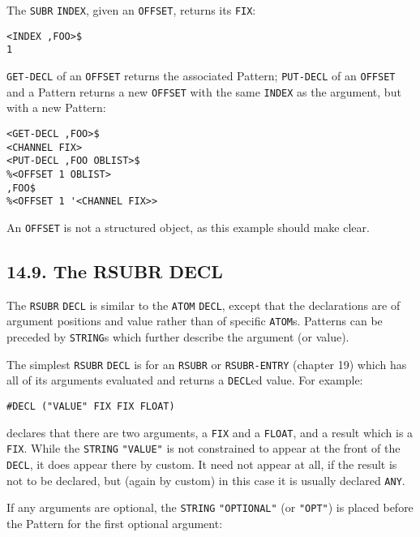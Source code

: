 \documentclass[a4paper,]{article}
\begin{document}
The \texttt{SUBR} \texttt{INDEX}, given an \texttt{OFFSET}, returns its \texttt{FIX}:

\begin{verbatim}
<INDEX ,FOO>$
1
\end{verbatim}

\texttt{GET-DECL} of an \texttt{OFFSET} returns the associated Pattern; \texttt{PUT-DECL}
 of an \texttt{OFFSET} and a Pattern returns a new \texttt{OFFSET} with the same \texttt{INDEX} as
the argument, but with a new Pattern:

\begin{verbatim}
<GET-DECL ,FOO>$
<CHANNEL FIX>
<PUT-DECL ,FOO OBLIST>$
%<OFFSET 1 OBLIST>
,FOO$
%<OFFSET 1 '<CHANNEL FIX>>
\end{verbatim}

An \texttt{OFFSET} is not a structured object, as this example should make clear.

\subsection{14.9. The RSUBR DECL}\label{the-rsubr-decl}

The \texttt{RSUBR} \texttt{DECL} is similar to the \texttt{ATOM} \texttt{DECL}, except that the declarations are of
argument positions and value rather than of specific \texttt{ATOM}s. Patterns can be preceded by \texttt{STRING}s which
further describe the argument (or value).

The simplest \texttt{RSUBR} \texttt{DECL} is for an \texttt{RSUBR} or \texttt{RSUBR-ENTRY} (chapter 19) which has all of
its arguments evaluated and returns a \texttt{DECL}ed value. For example:

\begin{verbatim}
#DECL ("VALUE" FIX FIX FLOAT)
\end{verbatim}

 declares that there are two arguments, a \texttt{FIX} and a \texttt{FLOAT}, and a result
which is a \texttt{FIX}. While the \texttt{STRING} \texttt{"VALUE"} is not constrained to appear at the front of the
\texttt{DECL}, it does appear there by custom. It need not appear at all, if the result is not to be declared, but (again
by custom) in this case it is usually declared \texttt{ANY}.

If any arguments are optional, the \texttt{STRING} \texttt{"OPTIONAL"}  (or \texttt{"OPT"})
 is placed before the Pattern for the first optional argument:
\end{document}

